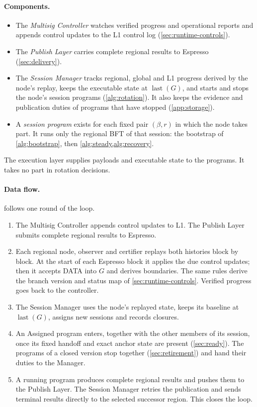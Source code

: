 \documentclass[11pt,a4paper]{article}
\newcommand{\defterm}[1]{\textcolor{rrBlue}{\textit{#1}}}
\begin{document}
\paragraph{Components.}
\begin{itemize}
\item The \defterm{Multisig Controller} watches verified progress and
operational reports and appends control updates to the L1 control log
(\cref{sec:runtime-controls}).
\item The \defterm{Publish Layer} carries complete regional results to
Espresso (\cref{sec:delivery}).
\item The \defterm{Session Manager} tracks regional, global and L1
progress derived by the node's replay, keeps the executable state at
$\operatorname{last}(G)$, and starts and stops the node's session
programs (\cref{alg:rotation}). It also keeps the evidence and
publication duties of programs that have stopped (\cref{app:storage}).
\item A \defterm{session program} exists for each fixed pair
$(\beta,r)$ in which the node takes part. It runs only the regional BFT
of that session: the bootstrap of \cref{alg:bootstrap}, then
\cref{alg:steady,alg:recovery}.
\end{itemize}
The execution layer supplies payloads and executable state to the
programs. It takes no part in rotation decisions.

\paragraph{Data flow.}
 follows one round of the loop.
\begin{enumerate}[label=(\arabic*)]
\item The Multisig Controller appends control updates to L1. The Publish
Layer submits complete regional results to Espresso.
\item Each regional node, observer and certifier replays both histories
block by block. At the start of each Espresso block it applies the due
control updates; then it accepts DATA into $G$ and derives boundaries.
The same rules derive the branch version and status map of
\cref{sec:runtime-controls}. Verified progress goes back to the
controller.
\item The Session Manager uses the node's replayed state, keeps its
baseline at $\operatorname{last}(G)$, assigns new sessions and records
closures.
\item An Assigned program enters, together with the other members of
its session, once its fixed handoff and exact anchor state are present
(\cref{sec:ready}). The programs of a closed version stop together
(\cref{sec:retirement}) and hand their duties to the Manager.
\item A running program produces complete regional results and pushes
them to the Publish Layer. The Session Manager retries the publication
and sends terminal results directly to the selected successor region.
This closes the loop.
\end{enumerate}
\end{document}
